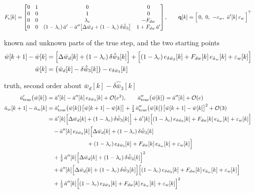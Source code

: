 \documentclass[11pt,a4paper,fontset=none]{ctexart}
\newcommand{\ba}{\bar{a}}
\newcommand{\bw}{\bar{w}}
\begin{document}
\begin{equation*}
F_e[k] =
\begin{bmatrix}
0 & 1 & 0 & 0 \\
0 & 0 & 1 & 0 \\
0 & 0 & \lambda_c & -F_{dw} \\
0 & 0 & (1-\lambda_c)\,\ba' - \ba''\bigl[\Delta\bw_d + (1-\lambda_c)\,\delta\hat{\bw}_3\bigr] & 1 + F_{dw}\,\ba'
\end{bmatrix} ,
\qquad
\mathbf{q}[k] = \Bigl[\,0,\ 0,\ -\varepsilon_w,\ \ba'[k]\,\varepsilon_w\,\Bigr]^{\top}
\end{equation*}

known and unknown parts of the true step, and the two starting points
\begin{align*}
\bw[k+1] - \bw[k] &= \Bigl[\Delta\bw_d[k] + (1-\lambda_c)\,\delta\hat{\bw}_3[k]\Bigr]
  + \Bigl[(1-\lambda_c)\,e_{\delta\bw_3}[k] + F_{dw}[k]\,e_{\ba_w}[k] + \varepsilon_w[k]\Bigr] \\
\bw[k] &= \bigl(\bw_d[k] - \delta\hat{\bw}_3[k]\bigr) - e_{\delta\bw_3}[k]
\end{align*}

truth, second order about $\bw_d[k] - \delta\hat{\bw}_3[k]$
\begingroup\small
\begin{align*}
\ba'_{\mathrm{true}}\bigl(\bw[k]\bigr) &= \ba'[k] - \ba''[k]\,e_{\delta\bw_3}[k] + \mathcal{O}(e^{2}) , \qquad
\ba''_{\mathrm{true}}\bigl(\bw[k]\bigr) = \ba''[k] + \mathcal{O}(e) \\
\ba_w[k+1] - \ba_w[k]
  &= \ba'_{\mathrm{true}}\bigl(\bw[k]\bigr)\bigl[\bw[k+1] - \bw[k]\bigr]
   + \tfrac{1}{2}\,\ba''_{\mathrm{true}}\bigl(\bw[k]\bigr)\bigl[\bw[k+1] - \bw[k]\bigr]^{2} + \mathcal{O}(3) \\
  &= \ba'[k]\Bigl[\Delta\bw_d[k] + (1-\lambda_c)\,\delta\hat{\bw}_3[k]\Bigr]
   + \ba'[k]\Bigl[(1-\lambda_c)\,e_{\delta\bw_3}[k] + F_{dw}[k]\,e_{\ba_w}[k] + \varepsilon_w[k]\Bigr] \\
  &\quad - \ba''[k]\,e_{\delta\bw_3}[k]\Bigl[\Delta\bw_d[k] + (1-\lambda_c)\,\delta\hat{\bw}_3[k] \\
  &\qquad\qquad\qquad\quad
      + (1-\lambda_c)\,e_{\delta\bw_3}[k] + F_{dw}[k]\,e_{\ba_w}[k] + \varepsilon_w[k]\Bigr] \\
  &\quad + \tfrac{1}{2}\,\ba''[k]\Bigl[\Delta\bw_d[k] + (1-\lambda_c)\,\delta\hat{\bw}_3[k]\Bigr]^{2} \\
  &\quad + \ba''[k]\Bigl[\Delta\bw_d[k] + (1-\lambda_c)\,\delta\hat{\bw}_3[k]\Bigr]
     \Bigl[(1-\lambda_c)\,e_{\delta\bw_3}[k] + F_{dw}[k]\,e_{\ba_w}[k] + \varepsilon_w[k]\Bigr] \\
  &\quad + \tfrac{1}{2}\,\ba''[k]\Bigl[(1-\lambda_c)\,e_{\delta\bw_3}[k] + F_{dw}[k]\,e_{\ba_w}[k] + \varepsilon_w[k]\Bigr]^{2}
\end{align*}
\endgroup
\end{document}

